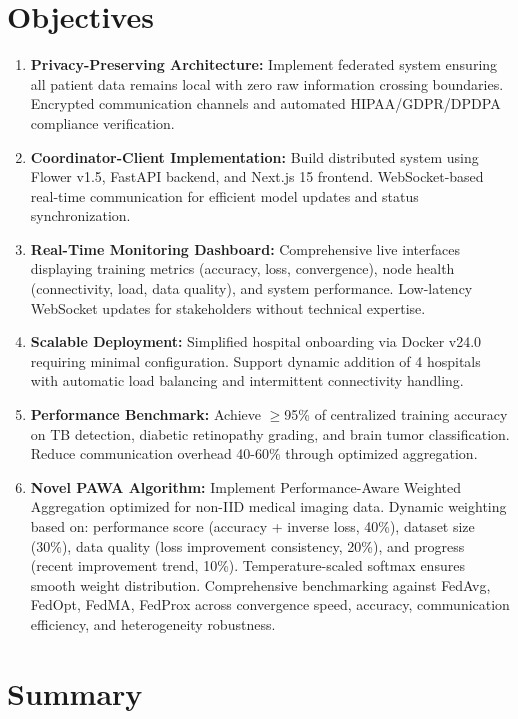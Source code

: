 \section{Objectives}

\begin{enumerate}
    \item \textbf{Privacy-Preserving Architecture:} Implement federated system ensuring all patient data remains local with zero raw information crossing boundaries. Encrypted communication channels and automated HIPAA/GDPR/DPDPA compliance verification.
    \item \textbf{Coordinator-Client Implementation:} Build distributed system using Flower v1.5, FastAPI backend, and Next.js 15 frontend. WebSocket-based real-time communication for efficient model updates and status synchronization.
    \item \textbf{Real-Time Monitoring Dashboard:} Comprehensive live interfaces displaying training metrics (accuracy, loss, convergence), node health (connectivity, load, data quality), and system performance. Low-latency WebSocket updates for stakeholders without technical expertise.
    \item \textbf{Scalable Deployment:} Simplified hospital onboarding via Docker v24.0 requiring minimal configuration. Support dynamic addition of 4 hospitals with automatic load balancing and intermittent connectivity handling.
    \item \textbf{Performance Benchmark:} Achieve $\ge$95\% of centralized training accuracy on TB detection, diabetic retinopathy grading, and brain tumor classification. Reduce communication overhead 40-60\% through optimized aggregation.
    \item \textbf{Novel PAWA Algorithm:} Implement Performance-Aware Weighted Aggregation optimized for non-IID medical imaging data. Dynamic weighting based on: performance score (accuracy + inverse loss, 40\%), dataset size (30\%), data quality (loss improvement consistency, 20\%), and progress (recent improvement trend, 10\%). Temperature-scaled softmax ensures smooth weight distribution. Comprehensive benchmarking against FedAvg, FedOpt, FedMA, FedProx across convergence speed, accuracy, communication efficiency, and heterogeneity robustness.
\end{enumerate}

\section{Summary}

